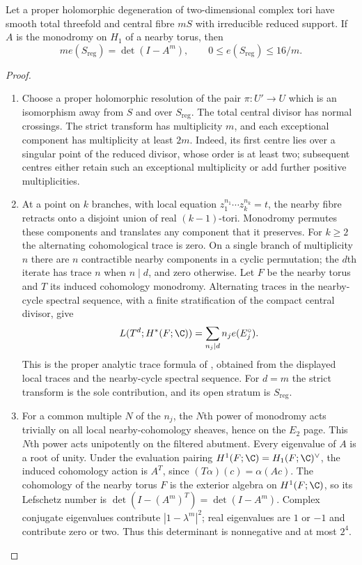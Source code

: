 \begin{proposition}\hypertarget{tag-02WK}{}\label{night:P4.13}\label{stmt:P4.13}

Let a proper holomorphic degeneration of two-dimensional complex
tori have smooth total threefold and central fibre $mS$ with
irreducible reduced support. If $A$ is the monodromy on $H_1$ of
a nearby torus, then
\[
 m e(S_{\mathrm{reg}})=\det(I-A^m),\qquad
 0\le e(S_{\mathrm{reg}})\le16/m.
\]
\end{proposition}
\begin{proof}

\begin{enumerate}[label=\arabic*.,leftmargin=*]
\item Choose a proper holomorphic resolution of the pair
$\pi:U'\to U$ which is an isomorphism away from $S$ and over
$S_{\mathrm{reg}}$. The total central divisor has normal crossings.
The strict transform has multiplicity $m$, and each exceptional
component has multiplicity at least $2m$. Indeed, its first centre
lies over a singular point of the reduced divisor, whose order is
at least two; subsequent centres either retain such an exceptional
multiplicity or add further positive multiplicities.

\item At a point on $k$ branches,
with local equation $z_1^{n_1}\cdots z_k^{n_k}=t$, the nearby
fibre retracts onto a disjoint union of real $(k-1)$-tori.
Monodromy permutes these components and translates any component
that it preserves. For $k\ge2$ the alternating cohomological
trace is zero. On a single branch of multiplicity $n$ there are
$n$ contractible nearby components in a cyclic permutation;
the $d$th iterate has trace $n$ when $n\mid d$, and zero otherwise.
Let $F$ be the nearby torus and $T$ its induced cohomology monodromy. Alternating traces in the nearby-cycle spectral sequence, with a
finite stratification of the compact central divisor, give
\[
 L(T^d;H^*(F;\C))=\sum_{n_j\mid d}n_j e(E_j^\circ).
\]
This is the proper analytic trace formula of \citet[Theorem~1, p.~235; \S\S2--3, pp.~237--245]{ACampo1975}, obtained from the displayed local traces and the nearby-cycle spectral sequence.
For $d=m$ the strict transform is the sole contribution, and its
open stratum is $S_{\mathrm{reg}}$.

\item For a common multiple $N$
of the $n_j$, the $N$th power of monodromy acts trivially on all local
nearby-cohomology sheaves, hence on the $E_2$ page. This $N$th power
acts unipotently on the filtered abutment. Every
eigenvalue of $A$ is a root of unity. Under the evaluation pairing $H^1(F;\C)=H_1(F;\C)^\vee$, the induced cohomology action is $A^T$, since $(T\alpha)(c)=\alpha(Ac)$. The cohomology of the nearby torus $F$ is the exterior algebra on $H^1(F;\C)$, so its Lefschetz number is
$\det(I-(A^m)^T)=\det(I-A^m)$. Complex conjugate eigenvalues contribute
$|1-\lambda^m|^2$; real eigenvalues are $1$ or $-1$ and
contribute zero or two. Thus this determinant is nonnegative
and at most $2^4$.

\end{enumerate}
\end{proof}